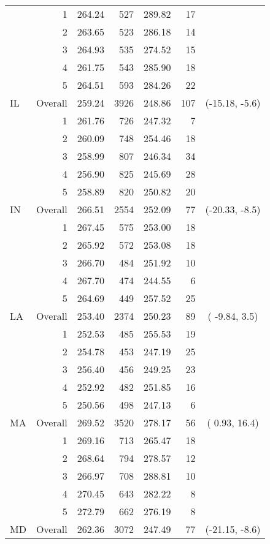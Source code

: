 \begin{longtable}{lrrr@{\extracolsep{.25cm}}rrc}
   & 1 & 264.24 & 527 & 289.82 &  17 &  \\ 
   & 2 & 263.65 & 523 & 286.18 &  14 &  \\ 
   & 3 & 264.93 & 535 & 274.52 &  15 &  \\ 
   & 4 & 261.75 & 543 & 285.90 &  18 &  \\ 
   & 5 & 264.51 & 593 & 284.26 &  22 &  \\ 
   \hline
IL & Overall & 259.24 & 3926 & 248.86 & 107 & (-15.18,  -5.6) \\ 
   & 1 & 261.76 & 726 & 247.32 &   7 &  \\ 
   & 2 & 260.09 & 748 & 254.46 &  18 &  \\ 
   & 3 & 258.99 & 807 & 246.34 &  34 &  \\ 
   & 4 & 256.90 & 825 & 245.69 &  28 &  \\ 
   & 5 & 258.89 & 820 & 250.82 &  20 &  \\ 
   \hline
IN & Overall & 266.51 & 2554 & 252.09 &  77 & (-20.33,  -8.5) \\ 
   & 1 & 267.45 & 575 & 253.00 &  18 &  \\ 
   & 2 & 265.92 & 572 & 253.08 &  18 &  \\ 
   & 3 & 266.70 & 484 & 251.92 &  10 &  \\ 
   & 4 & 267.70 & 474 & 244.55 &   6 &  \\ 
   & 5 & 264.69 & 449 & 257.52 &  25 &  \\ 
   \hline
LA & Overall & 253.40 & 2374 & 250.23 &  89 & ( -9.84,   3.5) \\ 
   & 1 & 252.53 & 485 & 255.53 &  19 &  \\ 
   & 2 & 254.78 & 453 & 247.19 &  25 &  \\ 
   & 3 & 256.40 & 456 & 249.25 &  23 &  \\ 
   & 4 & 252.92 & 482 & 251.85 &  16 &  \\ 
   & 5 & 250.56 & 498 & 247.13 &   6 &  \\ 
   \hline
MA & Overall & 269.52 & 3520 & 278.17 &  56 & (  0.93,  16.4) \\ 
   & 1 & 269.16 & 713 & 265.47 &  18 &  \\ 
   & 2 & 268.64 & 794 & 278.57 &  12 &  \\ 
   & 3 & 266.97 & 708 & 288.81 &  10 &  \\ 
   & 4 & 270.45 & 643 & 282.22 &   8 &  \\ 
   & 5 & 272.79 & 662 & 276.19 &   8 &  \\ 
   \hline
MD & Overall & 262.36 & 3072 & 247.49 &  77 & (-21.15,  -8.6) \\ 

\end{longtable}
